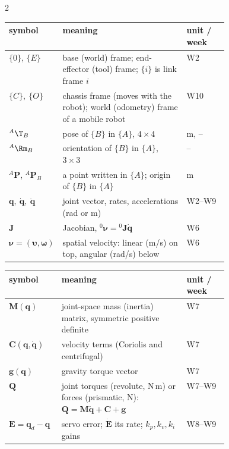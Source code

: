 \begin{multicols}{2}
\columnbreak
{}
\begin{fbx}
\begin{tabularx}{\linewidth}{@{}>{\raggedright\arraybackslash}p{0.24\linewidth}X>{\raggedright\arraybackslash}p{0.19\linewidth}@{}}\toprule
symbol & meaning & unit / week\\\midrule
$\{0\}$, $\{E\}$ & base (world) frame; end-effector (tool) frame; $\{i\}$ is link frame $i$ & W2\\
$\{C\},\ \{O\}$ & chassis frame (moves with the robot); world (odometry) frame of a mobile robot & W10\\
${}^A\T_B$ & pose of $\{B\}$ in $\{A\}$, $4\times4$ & m, --\\
${}^A\Rm_B$ & orientation of $\{B\}$ in $\{A\}$, $3\times3$ & --\\
${}^A\mathbf P$, ${}^A\mathbf P_B$ & a point written in $\{A\}$; origin of $\{B\}$ in $\{A\}$ & m\\
$\mathbf q,\ \dot{\mathbf q},\ \ddot{\mathbf q}$ & joint vector, rates, accelerations (rad or m) & W2--W9\\
$\mathbf J$ & Jacobian, ${}^0\boldsymbol\nu={}^0\mathbf J\dot{\mathbf q}$ & W6\\
$\boldsymbol\nu=(\boldsymbol\upsilon,\boldsymbol\omega)$ & spatial velocity: linear (m/s) on top, angular (rad/s) below & W6\\\bottomrule
\end{tabularx}
\end{fbx}
\begin{fbx}
\begin{tabularx}{\linewidth}{@{}>{\raggedright\arraybackslash}p{0.24\linewidth}X>{\raggedright\arraybackslash}p{0.19\linewidth}@{}}\toprule
symbol & meaning & unit / week\\\midrule
$\mathbf M(\mathbf q)$ & joint-space mass (inertia) matrix, symmetric positive definite & W7\\
$\mathbf C(\mathbf q,\dot{\mathbf q})$ & velocity terms (Coriolis and centrifugal) & W7\\
$\mathbf g(\mathbf q)$ & gravity torque vector & W7\\
$\mathbf Q$ & joint torques (revolute, N\,m) or forces (prismatic, N): $\mathbf Q=\mathbf M\ddot{\mathbf q}+\mathbf C+\mathbf g$ & W7--W9\\
$\mathbf E=\mathbf q_d-\mathbf q$ & servo error; $\dot{\mathbf E}$ its rate; $k_p,k_v,k_i$ gains & W8--W9\\

\end{tabularx}
\end{fbx}
\end{multicols}
